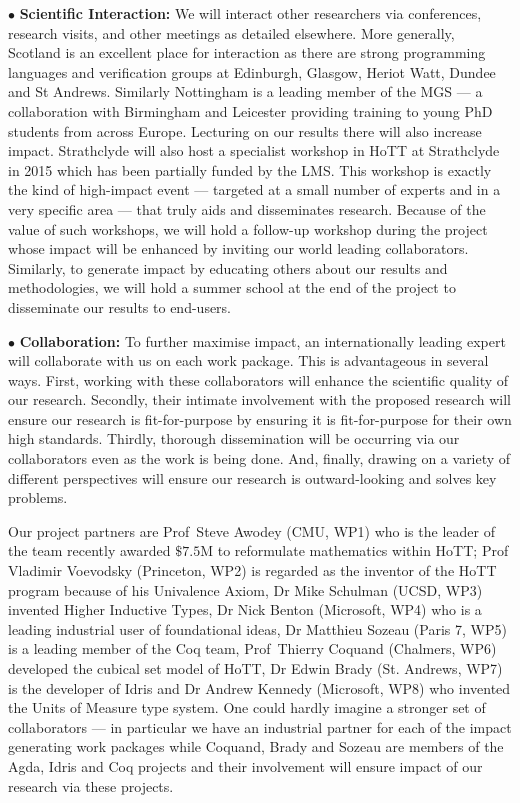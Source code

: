 \documentclass[a4paper,11pt]{article}
\begin{document}
\vspace*{0.02in} $\bullet$ {\bf Scientific Interaction:} We will
interact other researchers via conferences,
research visits, and other meetings as detailed elsewhere. More
generally, Scotland is an excellent place for interaction as there are
strong programming languages and verification groups at Edinburgh,
Glasgow, Heriot Watt, Dundee and St Andrews. Similarly Nottingham is a
leading member of the MGS --- a collaboration with Birmingham and
Leicester providing training to young PhD students
from across Europe. Lecturing on our results there will also increase
impact. Strathclyde will also host a specialist
workshop in HoTT at Strathclyde in 2015 which has been partially
funded by the LMS. This workshop is exactly the kind of high-impact
event --- targeted at a small number of experts and in a very specific
area --- that truly aids and disseminates research. Because of the
value of such workshops, we will hold a follow-up workshop during
the project whose impact will be enhanced by inviting our
world leading collaborators. Similarly, to generate impact by
educating others about our results and methodologies, we will hold a
summer school at the end of the project to disseminate our results to
end-users.

\vspace*{0.02in}

$\bullet$ {\bf Collaboration:} To further maximise impact, an
internationally leading expert will collaborate with us on each work
package.  This is advantageous in several ways. First, working with
these collaborators will enhance the scientific quality of our
research. Secondly, their intimate involvement with the proposed
research will ensure our research is fit-for-purpose by ensuring it is
fit-for-purpose for their own high standards. Thirdly, thorough
dissemination will be occurring via our collaborators even as the work
is being done. And, finally, drawing on a variety of different
perspectives will ensure our research is outward-looking and solves
key problems.

Our project partners are Prof~Steve Awodey (CMU, WP1) who is the
leader of the team recently awarded $\$7.5$M to reformulate
mathematics within HoTT; Prof Vladimir Voevodsky (Princeton, WP2) is
regarded as the inventor of the HoTT program because of his Univalence
Axiom, Dr Mike Schulman (UCSD, WP3) invented Higher Inductive
Types, Dr Nick Benton (Microsoft, WP4) who is a leading industrial
user of foundational ideas, Dr Matthieu Sozeau (Paris 7, WP5) is a
leading member of the Coq team, Prof~Thierry Coquand (Chalmers, WP6)
developed the cubical set model of HoTT, Dr Edwin Brady
(St. Andrews, WP7) is the developer of Idris and Dr Andrew Kennedy
(Microsoft, WP8) who invented the Units of Measure type system. One
could hardly imagine a stronger set of collaborators --- in particular
we have an industrial partner for each of the impact generating work
packages while Coquand, Brady and Sozeau are members of the Agda,
Idris and Coq projects and their involvement will ensure impact of our
research via these projects.
\end{document}
